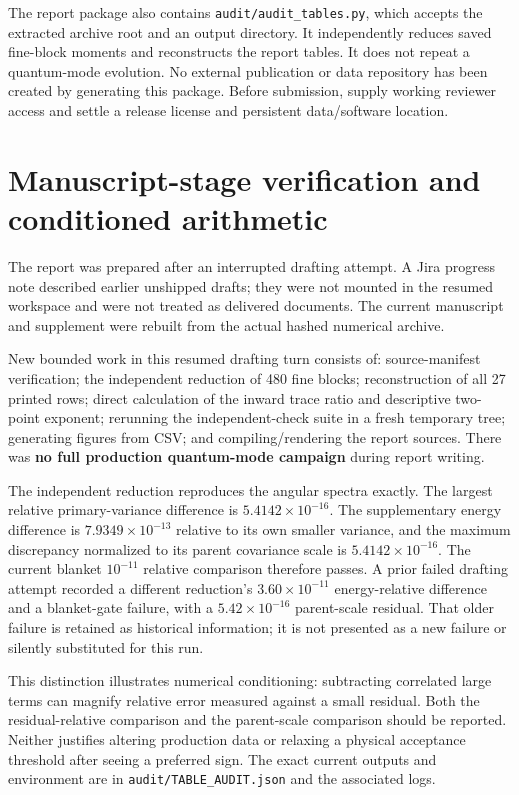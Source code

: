 \documentclass[10pt]{article}
\begin{document}
The report package also contains \texttt{audit/audit\_tables.py}, which accepts the extracted archive root and an output directory. It independently reduces saved fine-block moments and reconstructs the report tables. It does not repeat a quantum-mode evolution. No external publication or data repository has been created by generating this package. Before submission, supply working reviewer access and settle a release license and persistent data/software location.

\section{Manuscript-stage verification and conditioned arithmetic}
The report was prepared after an interrupted drafting attempt. A Jira progress note described earlier unshipped drafts; they were not mounted in the resumed workspace and were not treated as delivered documents. The current manuscript and supplement were rebuilt from the actual hashed numerical archive.

New bounded work in this resumed drafting turn consists of: source-manifest verification; the independent reduction of 480 fine blocks; reconstruction of all 27 printed rows; direct calculation of the inward trace ratio and descriptive two-point exponent; rerunning the independent-check suite in a fresh temporary tree; generating figures from CSV; and compiling/rendering the report sources. There was \textbf{no full production quantum-mode campaign} during report writing.

The independent reduction reproduces the angular spectra exactly. The largest relative primary-variance difference is $5.4142\times10^{-16}$. The supplementary energy difference is $7.9349\times10^{-13}$ relative to its own smaller variance, and the maximum discrepancy normalized to its parent covariance scale is $5.4142\times10^{-16}$. The current blanket $10^{-11}$ relative comparison therefore passes. A prior failed drafting attempt recorded a different reduction's $3.60\times10^{-11}$ energy-relative difference and a blanket-gate failure, with a $5.42\times10^{-16}$ parent-scale residual. That older failure is retained as historical information; it is not presented as a new failure or silently substituted for this run.

This distinction illustrates numerical conditioning: subtracting correlated large terms can magnify relative error measured against a small residual. Both the residual-relative comparison and the parent-scale comparison should be reported. Neither justifies altering production data or relaxing a physical acceptance threshold after seeing a preferred sign. The exact current outputs and environment are in \texttt{audit/TABLE\_AUDIT.json} and the associated logs.
\end{document}
